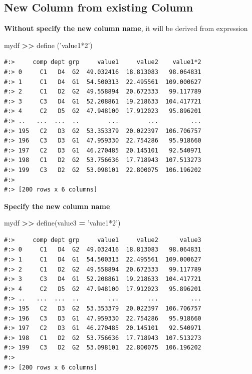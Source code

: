 \documentclass[
]{book}
\newenvironment{Shaded}{\begin{snugshade}}{\end{snugshade}}
\newcommand{\NormalTok}[1]{#1}
\newcommand{\OperatorTok}[1]{\textcolor[rgb]{0.43,0.43,0.43}{\textbf{#1}}}
\newcommand{\StringTok}[1]{\textcolor[rgb]{0.5,0.5,0.5}{#1}}
\begin{document}
\hypertarget{new-column-from-existing-column}{%
\subsection{New Column from existing Column}\label{new-column-from-existing-column}}

\textbf{Without specify the new column name}, it will be derived from expression

\begin{Shaded}
\begin{Highlighting}[]
\NormalTok{mydf }\OperatorTok{>>}\NormalTok{ define (}\StringTok{'value1*2'}\NormalTok{)}
\end{Highlighting}
\end{Shaded}

\begin{verbatim}
#:>     comp dept grp     value1     value2    value1*2
#:> 0     C1   D4  G2  49.032416  18.813083   98.064831
#:> 1     C1   D4  G1  54.500313  22.495561  109.000627
#:> 2     C1   D2  G2  49.558894  20.672333   99.117789
#:> 3     C3   D4  G1  52.208861  19.218633  104.417721
#:> 4     C2   D5  G2  47.948100  17.912023   95.896201
#:> ..   ...  ...  ..        ...        ...         ...
#:> 195   C2   D3  G2  53.353379  20.022397  106.706757
#:> 196   C3   D3  G1  47.959330  22.754286   95.918660
#:> 197   C2   D3  G1  46.270485  20.145101   92.540971
#:> 198   C1   D2  G2  53.756636  17.718943  107.513273
#:> 199   C3   D2  G2  53.098101  22.800075  106.196202
#:> 
#:> [200 rows x 6 columns]
\end{verbatim}

\textbf{Specify the new column name}

\begin{Shaded}
\begin{Highlighting}[]
\NormalTok{mydf }\OperatorTok{>>}\NormalTok{ define(value3 }\OperatorTok{=} \StringTok{'value1*2'}\NormalTok{)}
\end{Highlighting}
\end{Shaded}

\begin{verbatim}
#:>     comp dept grp     value1     value2      value3
#:> 0     C1   D4  G2  49.032416  18.813083   98.064831
#:> 1     C1   D4  G1  54.500313  22.495561  109.000627
#:> 2     C1   D2  G2  49.558894  20.672333   99.117789
#:> 3     C3   D4  G1  52.208861  19.218633  104.417721
#:> 4     C2   D5  G2  47.948100  17.912023   95.896201
#:> ..   ...  ...  ..        ...        ...         ...
#:> 195   C2   D3  G2  53.353379  20.022397  106.706757
#:> 196   C3   D3  G1  47.959330  22.754286   95.918660
#:> 197   C2   D3  G1  46.270485  20.145101   92.540971
#:> 198   C1   D2  G2  53.756636  17.718943  107.513273
#:> 199   C3   D2  G2  53.098101  22.800075  106.196202
#:> 
#:> [200 rows x 6 columns]
\end{verbatim}
\end{document}
